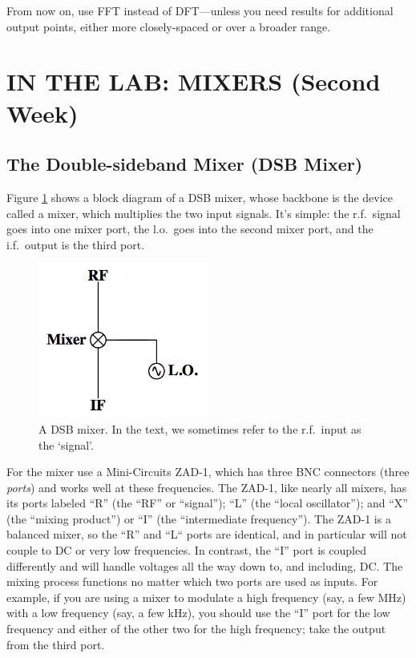 \documentclass[12pt,preprint]{aastex}
\begin{document}
From now on, use FFT instead of DFT---unless you need results for
additional output points, either more closely-spaced or over a broader
range.



\section{IN THE LAB: MIXERS (Second Week)} \label{mixersect}

\subsection{The Double-sideband Mixer (DSB Mixer)} \label{sectdsb}

Figure \ref{dsb} shows a block diagram of a DSB mixer, whose backbone is
the device called a mixer, which multiplies the two input signals. It's simple: the
r.f.\ signal goes into one mixer port, the l.o.\ goes into the second
mixer port, and the i.f.\ output is the third port.

\begin{figure}[h!]
\begin{center}
  \includegraphics[height=2in]{dsbmixer.png}
\end{center}
\caption{\footnotesize A DSB mixer. In the text, we sometimes refer to
  the r.f.\ input as the `signal'. \label{dsb}}
\end{figure}

For the mixer use a Mini-Circuits ZAD-1, which has three BNC connectors
(three {\it ports}) and works well at these frequencies.  The ZAD-1,
like nearly all mixers, has its ports labeled ``R'' (the ``RF'' or
``signal''); ``L'' (the ``local oscillator''); and ``X'' (the ``mixing
product'') or ``I'' (the ``intermediate frequency'').  The ZAD-1 is a
balanced mixer, so the ``R'' and ``L`` ports are identical, and in
particular will not couple to DC or very low frequencies.  In contrast,
the ``I'' port is coupled differently and will handle voltages all the
way down to, and including, DC.  The mixing process functions no matter
which two ports are used as inputs.  For example, if you are using a
mixer to modulate a high frequency (say, a few MHz) with a low frequency
(say, a few kHz), you should use the ``I'' port for the low frequency
and either of the other two for the high frequency; take the output from
the third port.
\end{document}
